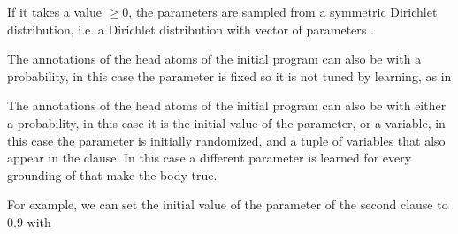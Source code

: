\documentclass[letterpaper,10pt,english]{sphinxmanual}
\begin{document}
\sphinxAtStartPar
If it takes a value \(\geq 0\), the parameters are sampled from a symmetric Dirichlet distribution, i.e. a Dirichlet distribution with vector of parameters .

\sphinxAtStartPar
The annotations of the head atoms of the initial program can also be  with  a probability, in this case the parameter is fixed so it is not tuned by learning, as in

\begin{sphinxVerbatim}[commandchars=\\\{\}]
\PYG{p}{[} 
         
        \PYG{p}{]}
\end{sphinxVerbatim}

\sphinxAtStartPar
The annotations of the head atoms of the initial program can also be  with  either a probability, in this case it is the initial value of the parameter, or a variable, in this case the parameter is initially randomized, and  a tuple of variables that also appear in the clause.
In this case a different parameter is learned for every grounding of  that make the body true.

\sphinxAtStartPar
For example, we can set the initial value of the parameter of the second clause to 0.9 with

\begin{sphinxVerbatim}[commandchars=\\\{\}]
\PYG{p}{[} 
         
        \PYG{p}{]}
\end{sphinxVerbatim}
\end{document}
